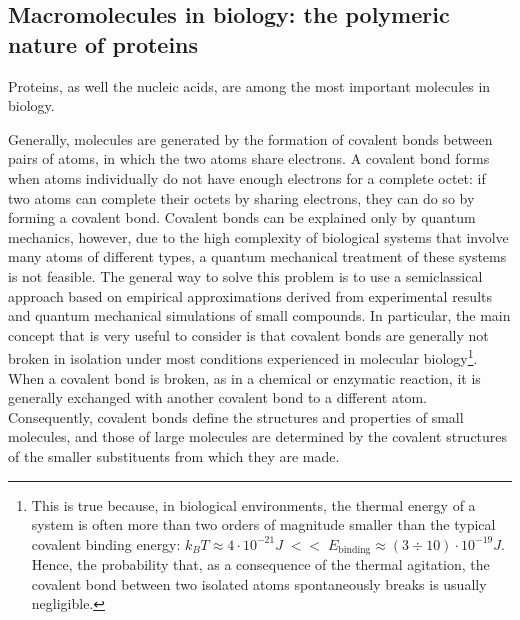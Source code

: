 \subsection{Macromolecules in biology: the polymeric nature of proteins}\label{ssec:polym-prot}
Proteins, as well the nucleic acids, are among the most important molecules in biology. 

Generally, molecules are generated by the formation of covalent bonds between pairs of atoms, in which the two atoms share electrons. A covalent bond forms when atoms individually do not have enough electrons for a complete octet: if two atoms can complete their octets by sharing electrons, they can do so by forming a covalent bond. Covalent bonds can be explained only by quantum mechanics, however, due to the high complexity of biological systems that involve many atoms of different types, a quantum mechanical treatment of these systems is not feasible.
The general way to solve this problem is to use a semiclassical approach based on empirical approximations derived from experimental results and quantum mechanical simulations of small compounds. In particular, the main concept that is very useful to consider is that covalent bonds are generally not broken in isolation under most conditions experienced in molecular biology\footnote{This is true because, in biological environments, the thermal energy of a system is often more than two orders of magnitude smaller than the typical covalent binding energy: $k_B T \approx 4 \cdot 10^{-21} J \; << \; E_{\text{binding}} \approx (3 \div 10) \cdot 10^{-19} J$. Hence, the probability that, as a consequence of the thermal agitation, the covalent bond between two isolated atoms spontaneously breaks is usually negligible.}. When a covalent bond is broken, as in a chemical or enzymatic reaction, it is generally exchanged with another covalent bond to a different atom. Consequently, covalent bonds define the structures and properties of small molecules, and those of large molecules are determined by the covalent structures of the smaller substituents from which they are made.

